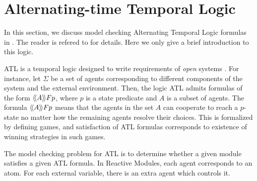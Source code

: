 \section{Alternating-time Temporal Logic}
In this section, we discuss model checking 
Alternating Temporal Logic formulas in \mocha.  The reader is
refered to \cite{ATL} for details. Here we only give a brief introduction
to this logic.

ATL is a temporal logic designed to write
requirements of {\em open\/} systems \cite{ATL}. For instance, let
$\Sigma$ be a set of agents corresponding to different components of
the system and the external environment.  Then, the logic ATL admits
formulas of the form $\langle\!\langle A \rangle\!\rangle F p$, where $p$ is a state predicate and
$A$ is a subset of agents.  The formula $\langle\!\langle A \rangle\!\rangle F p$ means that the
agents in the set $A$ can cooperate to reach a $p$-state no matter how
the remaining agents resolve their choices.  This is formalized by
defining games, and satisfaction of ATL formulas corresponds to
existence of winning strategies in such games.

The model checking problem for ATL is to determine whether a given module
satisfies a given ATL formula. In Reactive Modules, each agent corresponds
to an atom. For each external variable, there is an extra agent which
controls it. 


